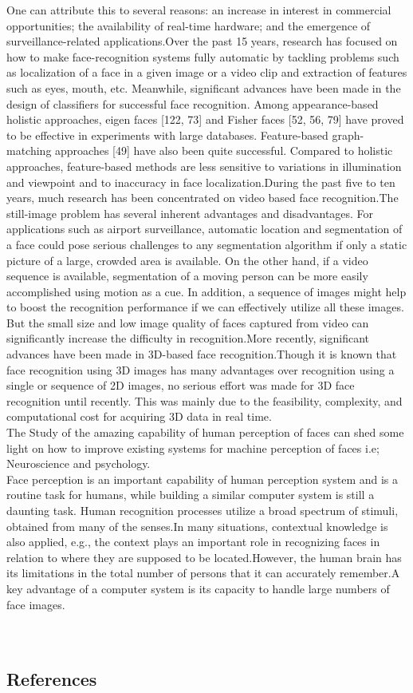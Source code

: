 \documentclass[10pt,a4paper]{article}
\begin{document}
One can attribute this to several reasons: an increase in interest in commercial
opportunities; the availability of real-time hardware; and the emergence of
surveillance-related applications.Over the past 15 years, research has focused on how to make face-recognition
systems fully automatic by tackling problems such as localization of a face in
a given image or a video clip and extraction of features such as eyes, mouth,
etc. Meanwhile, significant advances have been made in the design of classifiers
for successful face recognition. Among appearance-based holistic approaches,
eigen faces [122, 73] and Fisher faces [52, 56, 79] have proved to be effective in
experiments with large databases. Feature-based graph-matching approaches [49]
have also been quite successful. Compared to holistic approaches, feature-based methods are less sensitive to variations in illumination and viewpoint and to inaccuracy
in face localization.During the past five to ten years, much research has been concentrated on video based
face recognition.The still-image problem has several inherent advantages
and disadvantages. For applications such as airport surveillance, automatic location
and segmentation of a face could pose serious challenges to any segmentation
algorithm if only a static picture of a large, crowded area is available. On the other
hand, if a video sequence is available, segmentation of a moving person can be
more easily accomplished using motion as a cue. In addition, a sequence of images
might help to boost the recognition performance if we can effectively utilize all
these images. But the small size and low image quality of faces captured from
video can significantly increase the difficulty in recognition.More recently, significant advances have been made in 3D-based face recognition.Though it is known that face recognition using 3D images has many
advantages over recognition using a single or sequence of 2D images, no serious
effort was made for 3D face recognition until recently. This was mainly due
to the feasibility, complexity, and computational cost for acquiring 3D data in
real time.\\
The Study of the amazing capability of human
perception of faces can shed some light on how to improve existing systems
for machine perception of faces i.e; Neuroscience and psychology.\\
Face perception is an important capability of human perception system and is a
routine task for humans, while building a similar computer system is still a daunting
task. Human recognition processes utilize a broad spectrum of stimuli, obtained from many of the senses.In many situations, contextual knowledge is also applied, e.g., the context plays
an important role in recognizing faces in relation to where they are supposed to be
located.However, the
human brain has its limitations in the total number of persons that it can accurately
remember.A key advantage of a computer system is its capacity to handle large
numbers of face images.\\ \\ \\ 


\subsection{References}
\end{document}
